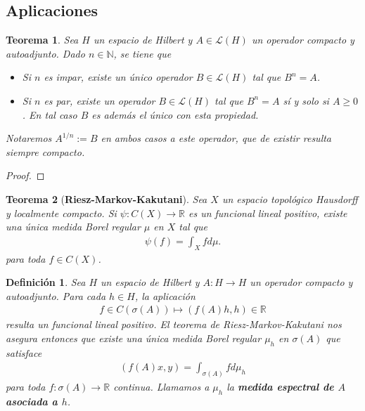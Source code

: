 \documentclass[11pt]{report}
\theoremstyle{colored}
\newtheorem{definition}{Definición}[section]
\newtheorem{theorem}{Teorema}[section]
\newcommand{\N}{\mathbb{N}}
\newcommand{\R}{\mathbb{R}}
\newcommand{\ip}[1]{( #1 )}
\begin{document}
\subsection{Aplicaciones}

\begin{theorem}  Sea $H$ un espacio de Hilbert y $A \in \mathscr{L}(H)$ un operador compacto y autoadjunto. Dado $n \in \N$, se tiene que 
\begin{itemize}
\item[(i)] Si $n$ es impar, existe un único operador $B \in \mathscr{L}(H)$ tal que $B^n = A$.
\item[(ii)] Si $n$ es par, existe un operador $B \in \mathscr{L}(H)$ tal que $B^n = A$ sí y solo si $A \geq 0$. En tal caso $B$ es además el único con esta propiedad.
\end{itemize}
Notaremos $A^{1/n} := B$ en ambos casos a este operador, que de existir resulta siempre compacto.
\end{theorem}
\begin{proof}
\end{proof}


\begin{tcolorbox}
\begin{theorem}[\textbf{Riesz-Markov-Kakutani}] Sea $X$ un espacio topológico Hausdorff y localmente compacto. Si $\psi : C(X) \to \R$ es un funcional lineal positivo, existe una única medida Borel regular $\mu$ en $X$ tal que
\begin{align*}
\psi(f) = \int_X f d\mu.
\end{align*}
para toda $f \in C(X)$.
\end{theorem}
\end{tcolorbox}

\begin{definition} Sea $H$ un espacio de Hilbert y $A : H \to H$ un operador compacto y autoadjunto. Para cada $h \in H$, la aplicación 
\begin{align*}
f \in C(\sigma(A)) \mapsto \ip{f(A)h,h} \in \R
\end{align*}
resulta un funcional lineal positivo. El teorema de Riesz-Markov-Kakutani nos asegura entonces que existe una única medida Borel regular $\mu_h$ en $\sigma(A)$ que satisface
\begin{align*}
\ip{f(A)x,y} = \int_{\sigma(A)} f d\mu_h
\end{align*}
para toda $f : \sigma(A) \to \R$ continua. Llamamos a $\mu_h$ la \textbf{medida espectral de $A$ asociada a $h$}.
\end{definition}
\end{document}
